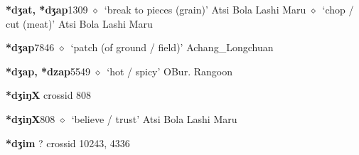   \begin{list}{}{\leftmargin=1.5em \itemindent=-1.5em}
  \item {\footnotesize \textbf{*dʒat, *dʒap}}{\tiny 1309}
         $\diamond$~`break to pieces (grain)'
         Atsi 
\hspace{1ex}
         Bola 
\hspace{1ex}
         Lashi 
\hspace{1ex}
         Maru 
\hspace{1ex}
         $\diamond$~`chop / cut (meat)'
         Atsi 
\hspace{1ex}
         Bola 
\hspace{1ex}
         Lashi 
\hspace{1ex}
         Maru 
  \item {\footnotesize \textbf{*dʒap}}{\tiny 7846}
\hspace{1ex}
         $\diamond$~`patch (of ground / field)'
         Achang\_Longchuan 
  \item {\footnotesize \textbf{*dʒap, *dzap}}{\tiny 5549}
\hspace{1ex}
         $\diamond$~`hot / spicy'
         OBur. 
\hspace{1ex}
         Rangoon 
  \end{list}
\item
\textbf{*dʒiŋX}
  {\tiny crossid 808}
  \begin{list}{}{\leftmargin=1.5em \itemindent=-1.5em}
  \item {\footnotesize \textbf{*dʒiŋX}}{\tiny 808}
         $\diamond$~`believe / trust'
         Atsi 
\hspace{1ex}
         Bola 
\hspace{1ex}
         Lashi 
\hspace{1ex}
         Maru 
  \end{list}
\item
\textbf{*dʒim}
?
  {\tiny crossid 10243, 4336}
